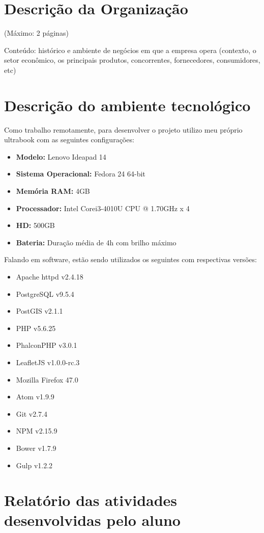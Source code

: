 \documentclass{ufscar}
\begin{document}
\section{Descrição da Organização}
(Máximo: 2 páginas)

Conteúdo: histórico e ambiente de negócios em  que a empresa opera (contexto, o setor econômico, os principais produtos, concorrentes, fornecedores, consumidores, etc)

\section{Descrição do ambiente tecnológico}
Como trabalho remotamente, para desenvolver o projeto utilizo meu próprio ultrabook com as seguintes configurações:
\begin{itemize}
  \item \textbf{Modelo:} Lenovo Ideapad 14
  \item \textbf{Sistema Operacional:} Fedora 24 64-bit
  \item \textbf{Memória RAM:} 4GB
  \item \textbf{Processador:} Intel\textsuperscript{\textregistered} Core\texttrademark  i3-4010U CPU @ 1.70GHz x 4
  \item \textbf{HD:} 500GB
  \item \textbf{Bateria:} Duração média de 4h com brilho máximo
\end{itemize}
Falando em software, estão sendo utilizados os seguintes com respectivas versões:
\begin{itemize}
  \item Apache httpd v2.4.18
  \item PostgreSQL v9.5.4
  \item PostGIS v2.1.1
  \item PHP v5.6.25
  \item PhalconPHP v3.0.1
  \item LeafletJS v1.0.0-rc.3
  \item Mozilla Firefox 47.0
  \item Atom v1.9.9
  \item Git v2.7.4
  \item NPM v2.15.9
  \item Bower v1.7.9
  \item Gulp v1.2.2
\end{itemize}

\section{Relatório das atividades desenvolvidas pelo aluno}
\end{document}
